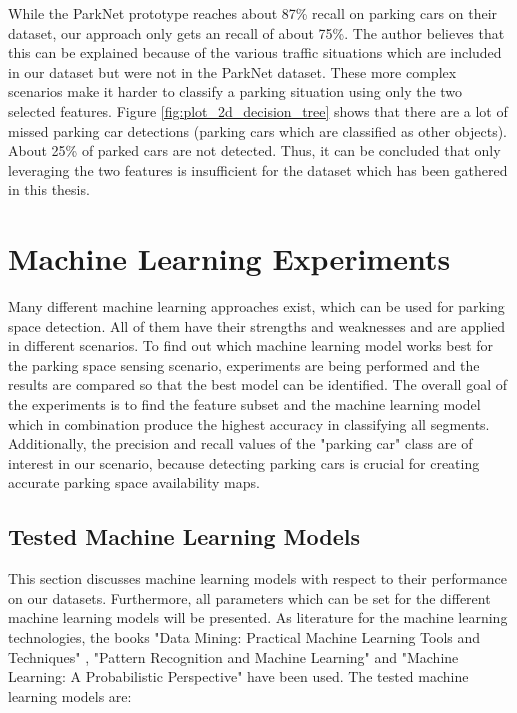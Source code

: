 While the ParkNet prototype reaches about 87\% recall on parking cars on their dataset, our approach only gets an recall of about 75\%. The author believes that this can be explained because of the various traffic situations which are included in our dataset but were not in the ParkNet dataset. These more complex scenarios make it harder to classify a parking situation using only the two selected features.
Figure \ref{fig:plot_2d_decision_tree} shows that there are a lot of missed parking car detections (parking cars which are classified as other objects). About 25\% of parked cars are not detected. Thus, it can be concluded that only leveraging the two features is insufficient for the dataset which has been gathered in this thesis.










\section{Machine Learning Experiments}
\label{sec:machine_learning_experiments}

Many different machine learning approaches exist, which can be used for parking space detection. All of them have their strengths and weaknesses and are applied in different scenarios. To find out which machine learning model works best for the parking space sensing scenario, experiments are being performed and the results are compared so that the best model can be identified. 
The overall goal of the experiments is to find the feature subset and the machine learning model which in combination produce the highest accuracy in classifying all segments. 
Additionally, the precision and recall values of the "parking car" class are of interest in our scenario, because detecting parking cars is crucial for creating accurate parking space availability maps.





\subsection{Tested Machine Learning Models}
\label{sec:machine_learning_models}

This section discusses machine learning models with respect to their performance on our datasets. Furthermore, all parameters which can be set for the different machine learning models will be presented. As literature for the machine learning technologies, the books "Data Mining: Practical Machine Learning Tools and Techniques" \cite{Hall2016_DataMining_ML}, "Pattern Recognition and Machine Learning" \cite{Bishop:2006:PRM:1162264} and "Machine Learning: A Probabilistic Perspective" \cite{Murphy:2012:MLP:2380985} have been used. The tested machine learning models are:

